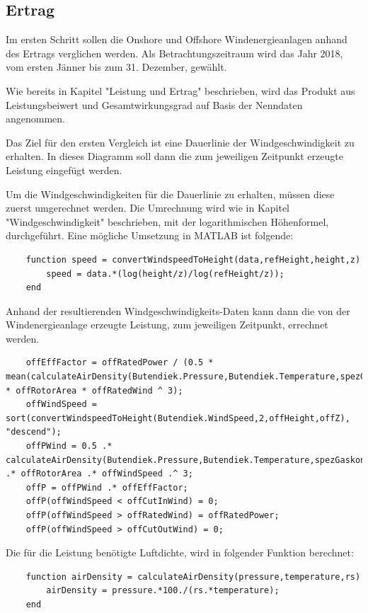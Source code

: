 \documentclass[a4paper,12pt]{article}
\begin{document}
	\subsection{Ertrag}
	Im ersten Schritt sollen die Onshore und Offshore Windenergieanlagen anhand des Ertrags verglichen werden. Als Betrachtungszeitraum wird das Jahr 2018, vom ersten Jänner bis zum 31. Dezember, gewählt.\\ \par
	\noindent Wie bereits in Kapitel "Leistung und Ertrag" beschrieben, wird das Produkt aus Leistungsbeiwert und Gesamtwirkungsgrad auf Basis der Nenndaten angenommen.\\ \par
	\noindent Das Ziel für den ersten Vergleich ist eine Dauerlinie der Windgeschwindigkeit zu erhalten. In dieses Diagramm soll dann die zum jeweiligen Zeitpunkt erzeugte Leistung eingefügt werden.\\ \par
	\noindent Um die Windgeschwindigkeiten für die Dauerlinie zu erhalten, müssen diese zuerst umgerechnet werden. Die Umrechnung wird wie in Kapitel "Windgeschwindigkeit" beschrieben, mit der logarithmischen Höhenformel, durchgeführt.\newline
	Eine mögliche Umsetzung in MATLAB ist folgende:
	\begin{lstlisting}
	function speed = convertWindspeedToHeight(data,refHeight,height,z)
		speed = data.*(log(height/z)/log(refHeight/z));
	end
	\end{lstlisting}
	Anhand der resultierenden Windgeschwindigkeits-Daten kann dann die von der Windenergieanlage erzeugte Leistung, zum jeweiligen Zeitpunkt, errechnet werden.
	\begin{lstlisting}
	offEffFactor = offRatedPower / (0.5 * mean(calculateAirDensity(Butendiek.Pressure,Butendiek.Temperature,spezGaskonst)) * offRotorArea * offRatedWind ^ 3);
	offWindSpeed = sort(convertWindspeedToHeight(Butendiek.WindSpeed,2,offHeight,offZ), "descend");
	offPWind = 0.5 .* calculateAirDensity(Butendiek.Pressure,Butendiek.Temperature,spezGaskonst) .* offRotorArea .* offWindSpeed .^ 3;
	offP = offPWind .* offEffFactor;
	offP(offWindSpeed < offCutInWind) = 0;
	offP(offWindSpeed > offRatedWind) = offRatedPower;
	offP(offWindSpeed > offCutOutWind) = 0;
	\end{lstlisting}
	Die für die Leistung benötigte Luftdichte, wird in folgender Funktion berechnet:
	\begin{lstlisting}
	function airDensity = calculateAirDensity(pressure,temperature,rs)
		airDensity = pressure.*100./(rs.*temperature);
	end
	\end{lstlisting}
\end{document}
